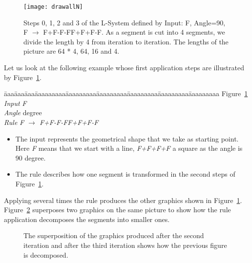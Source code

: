 \begin{figure}
\texttt{[image: drawallN]}
\caption{Steps 0, 1, 2 and 3 of the L-System defined by Input: F, Angle=90, F $\rightarrow$ F+F-F-FF+F+F-F. As a segment is cut into 4 segments, we divide the length by 4 from iteration to iteration. The lengths of the picture are 64 * 4, 64, 16 and 4.}\label{fig:nsteps}
\end{figure}

Let us look at the following example whose first application steps are
illustrated by Figure~\ref{fig:nsteps}.

\begin{tabbing}
\=aaa\=aaa\=aaa\=aaaaaaaaa\=aaaaaaaaa\=aaaaaaaaa\=aaaaaaaaa\=aaaaaaaaa\=aaaaaaaaa\kill
Figure~\ref{fig:nsteps}\\
\>\>\>\> \emph{Input} \>\>\emph{F}\\
\>\>\>\> \emph{Angle} \> degree\\
\>\>\>\> \emph{Rule}  \>\>\emph{F $\rightarrow$ F+F-F-FF+F+F-F}
\end{tabbing}

\begin{itemize}
\item The input represents the geometrical shape that we take as starting point. Here \emph{F} means that we start with a line, \emph{F+F+F+F} a square as the angle is 90 degree.

\item The rule describes how one segment is transformed in the second steps of Figure~\ref{fig:nsteps}.
\end{itemize}

Applying several times the rule produces the other graphics shown in
Figure~\ref{fig:nsteps}. Figure~\ref{fig:n1n2} superposes two
graphics on the same picture to show how the rule application
decomposes the segments into smaller ones.


\begin{figure}
\caption{The superposition of the graphics produced after the second iteration and after the third iteration shows how the previous figure is decomposed.}\label{fig:n1n2}
\end{figure}


